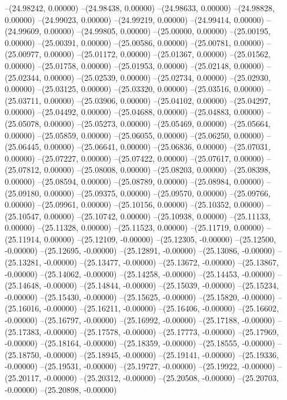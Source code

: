 --(24.98242, 0.00000)
--(24.98438, 0.00000)
--(24.98633, 0.00000)
--(24.98828, 0.00000)
--(24.99023, 0.00000)
--(24.99219, 0.00000)
--(24.99414, 0.00000)
--(24.99609, 0.00000)
--(24.99805, 0.00000)
--(25.00000, 0.00000)
--(25.00195, 0.00000)
--(25.00391, 0.00000)
--(25.00586, 0.00000)
--(25.00781, 0.00000)
--(25.00977, 0.00000)
--(25.01172, 0.00000)
--(25.01367, 0.00000)
--(25.01562, 0.00000)
--(25.01758, 0.00000)
--(25.01953, 0.00000)
--(25.02148, 0.00000)
--(25.02344, 0.00000)
--(25.02539, 0.00000)
--(25.02734, 0.00000)
--(25.02930, 0.00000)
--(25.03125, 0.00000)
--(25.03320, 0.00000)
--(25.03516, 0.00000)
--(25.03711, 0.00000)
--(25.03906, 0.00000)
--(25.04102, 0.00000)
--(25.04297, 0.00000)
--(25.04492, 0.00000)
--(25.04688, 0.00000)
--(25.04883, 0.00000)
--(25.05078, 0.00000)
--(25.05273, 0.00000)
--(25.05469, 0.00000)
--(25.05664, 0.00000)
--(25.05859, 0.00000)
--(25.06055, 0.00000)
--(25.06250, 0.00000)
--(25.06445, 0.00000)
--(25.06641, 0.00000)
--(25.06836, 0.00000)
--(25.07031, 0.00000)
--(25.07227, 0.00000)
--(25.07422, 0.00000)
--(25.07617, 0.00000)
--(25.07812, 0.00000)
--(25.08008, 0.00000)
--(25.08203, 0.00000)
--(25.08398, 0.00000)
--(25.08594, 0.00000)
--(25.08789, 0.00000)
--(25.08984, 0.00000)
--(25.09180, 0.00000)
--(25.09375, 0.00000)
--(25.09570, 0.00000)
--(25.09766, 0.00000)
--(25.09961, 0.00000)
--(25.10156, 0.00000)
--(25.10352, 0.00000)
--(25.10547, 0.00000)
--(25.10742, 0.00000)
--(25.10938, 0.00000)
--(25.11133, 0.00000)
--(25.11328, 0.00000)
--(25.11523, 0.00000)
--(25.11719, 0.00000)
--(25.11914, 0.00000)
--(25.12109, -0.00000)
--(25.12305, -0.00000)
--(25.12500, -0.00000)
--(25.12695, -0.00000)
--(25.12891, -0.00000)
--(25.13086, -0.00000)
--(25.13281, -0.00000)
--(25.13477, -0.00000)
--(25.13672, -0.00000)
--(25.13867, -0.00000)
--(25.14062, -0.00000)
--(25.14258, -0.00000)
--(25.14453, -0.00000)
--(25.14648, -0.00000)
--(25.14844, -0.00000)
--(25.15039, -0.00000)
--(25.15234, -0.00000)
--(25.15430, -0.00000)
--(25.15625, -0.00000)
--(25.15820, -0.00000)
--(25.16016, -0.00000)
--(25.16211, -0.00000)
--(25.16406, -0.00000)
--(25.16602, -0.00000)
--(25.16797, -0.00000)
--(25.16992, -0.00000)
--(25.17188, -0.00000)
--(25.17383, -0.00000)
--(25.17578, -0.00000)
--(25.17773, -0.00000)
--(25.17969, -0.00000)
--(25.18164, -0.00000)
--(25.18359, -0.00000)
--(25.18555, -0.00000)
--(25.18750, -0.00000)
--(25.18945, -0.00000)
--(25.19141, -0.00000)
--(25.19336, -0.00000)
--(25.19531, -0.00000)
--(25.19727, -0.00000)
--(25.19922, -0.00000)
--(25.20117, -0.00000)
--(25.20312, -0.00000)
--(25.20508, -0.00000)
--(25.20703, -0.00000)
--(25.20898, -0.00000)
